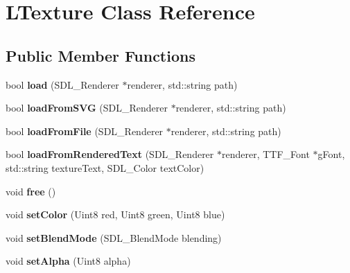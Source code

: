 \hypertarget{classLTexture}{}\section{L\+Texture Class Reference}
\label{classLTexture}
\subsection*{Public Member Functions}
\begin{DoxyCompactItemize}
\item 
\mbox{\label{classLTexture_a411a80e789685c8a58c2706d2c06bf97}} 
bool {\bfseries load} (S\+D\+L\+\_\+\+Renderer $\ast$renderer, std\+::string path)
\item 
\mbox{\label{classLTexture_acdf1f0ae50b5551ef20786e88d19f51e}} 
bool {\bfseries load\+From\+S\+VG} (S\+D\+L\+\_\+\+Renderer $\ast$renderer, std\+::string path)
\item 
\mbox{\label{classLTexture_aff14eed2ff06cd6699e61058fefa8baf}} 
bool {\bfseries load\+From\+File} (S\+D\+L\+\_\+\+Renderer $\ast$renderer, std\+::string path)
\item 
\mbox{\label{classLTexture_a9be4baedca90efcf28a69aae753b733d}} 
bool {\bfseries load\+From\+Rendered\+Text} (S\+D\+L\+\_\+\+Renderer $\ast$renderer, T\+T\+F\+\_\+\+Font $\ast$g\+Font, std\+::string texture\+Text, S\+D\+L\+\_\+\+Color text\+Color)
\item 
\mbox{\label{classLTexture_abef558f0b920270079925548a3976a06}} 
void {\bfseries free} ()
\item 
\mbox{\label{classLTexture_a4ccf201515ecb158b137394d41ed9077}} 
void {\bfseries set\+Color} (Uint8 red, Uint8 green, Uint8 blue)
\item 
\mbox{\label{classLTexture_aa1fe07070f715bf3981c129ae1619a4e}} 
void {\bfseries set\+Blend\+Mode} (S\+D\+L\+\_\+\+Blend\+Mode blending)
\item 
\mbox{\label{classLTexture_ab4e51b54752ae7b54614078f9128a9c0}} 
void {\bfseries set\+Alpha} (Uint8 alpha)
\item 

\end{DoxyCompactItemize}
